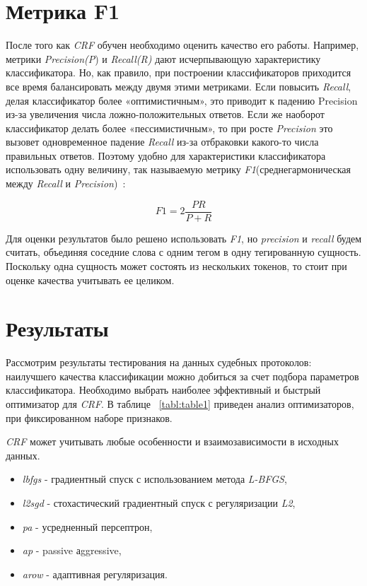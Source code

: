 \documentclass{csmathnotes}
\begin{document}
\section*{Метрика F1}
После того как \emph{CRF} обучен необходимо оценить качество его работы. Например, метрики \emph{Precision(P}) и \emph{Recall(R)} дают исчерпывающую характеристику классификатора. Но, как правило, при построении классификаторов приходится все время балансировать между двумя этими метриками. Если повысить \emph{Recall}, делая классификатор более «оптимистичным», это приводит к падению Precision из-за увеличения числа ложно-положительных ответов. Если же наоборот классификатор делать более «пессимистичным», то при росте \emph{Precision} это вызовет одновременное падение \emph{Recall} из-за отбраковки какого-то числа правильных ответов. Поэтому удобно для характеристики классификатора использовать одну величину, так называемую метрику \emph{F1}(среднегармоническая между \emph{Recall} и \emph{Precision})~\cite{А1}:

\begin{equation}
F1 = 2\frac{P R}{P + R} 
\end{equation}

Для оценки результатов было решено использовать \emph{F1}, но \emph{precision} и \emph{recall} будем считать, объединяя соседние слова с одним тегом в одну тегированную сущность. Поскольку одна сущность может состоять из нескольких токенов, то стоит при оценке качества учитывать ее целиком. 

\section*{Результаты}
Рассмотрим результаты тестирования на данных судебных протоколов: наилучшего качества классификации можно добиться за счет подбора параметров классификатора. Необходимо выбрать наиболее эффективный и быстрый оптимизатор для \emph{CRF}. В таблице ~\ref{tabl:table1} приведен анализ оптимизаторов, при фиксированном наборе признаков.


\emph{CRF} может учитывать любые особенности и взаимозависимости в исходных данных.
\begin{itemize}
	\item \emph{lbfgs} - градиентный спуск с использованием метода 
	\emph{L-BFGS},
	\item \emph{l2sgd} - стохастический  градиентный спуск с регуляризации \emph{L2},
	\item \emph{pa} - усредненный персептрон,
	\item \emph{ap} - passive аggressive,
	\item \emph{arow} - адаптивная регуляризация.
\end{itemize}
\end{document}

